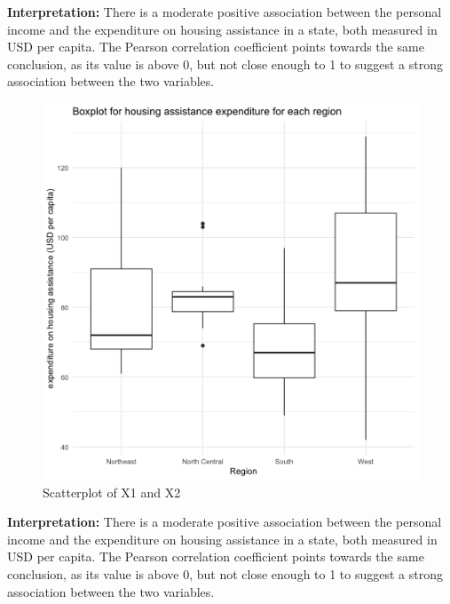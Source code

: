\documentclass[12pt,letterpaper]{article}
\begin{document}
\textbf{Interpretation:} There is a moderate positive association between the personal income and the expenditure on housing assistance in a state, both measured in USD per capita. The Pearson correlation coefficient points towards the same conclusion, as its value is above 0, but not close enough to 1 to suggest a strong association between the two variables. 
\newpage
\begin{figure}[h!]\centering
	\caption{\footnotesize Scatterplot of X1 and X2}
	\label{fig:plot_7}
	\includegraphics[width=.95\textwidth]{boxplot_reg_y.png}
\end{figure}
\textbf{Interpretation:} There is a moderate positive association between the personal income and the expenditure on housing assistance in a state, both measured in USD per capita. The Pearson correlation coefficient points towards the same conclusion, as its value is above 0, but not close enough to 1 to suggest a strong association between the two variables. 
\end{document}

